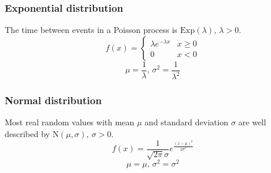 \subsubsection{Exponential distribution}
The time between events in a Poisson process is $\textrm{Exp}(\lambda),\,\lambda>0$.
$$f(x) = \left\{
\begin{array}{cl}
\lambda e^{-\lambda x} & x\geq0\\
0 & x<0
\end{array}\right.$$
$$\mu=\frac{1}{\lambda},\,\sigma^2=\frac{1}{\lambda^2}$$

\subsubsection{Normal distribution}
Most real random values with mean $\mu$ and standard deviation $\sigma$ are well described by $\textrm{N}(\mu,\sigma),\,\sigma>0$.
$$f(x) = \frac{1}{\sqrt{2\pi}\sigma}e^{\frac{(x-\mu)^2}{2\sigma^2}}$$
$$\mu = \mu,\,\sigma^2=\sigma^2$$
